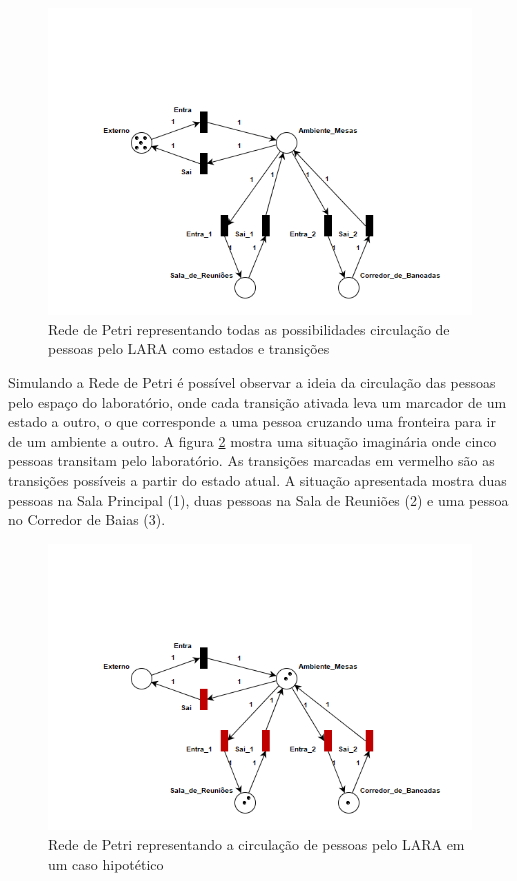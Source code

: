  \begin{figure}[H]
    \centering
    \includegraphics[width=0.8\linewidth]{figs/Metodologia/Petri_net.png}
    \caption{Rede de Petri representando todas as possibilidades circulação de pessoas pelo LARA como estados e transições}
    \label{fig:Petri1}
\end{figure}

Simulando a Rede de Petri é possível observar a ideia da circulação das pessoas pelo espaço do laboratório, onde cada transição ativada leva um marcador de um estado a outro, o que corresponde a uma pessoa cruzando uma fronteira para ir de um ambiente a outro. A figura \ref{fig:Petri2} mostra uma situação imaginária onde cinco pessoas transitam pelo laboratório. As transições marcadas em vermelho são as transições possíveis a partir do estado atual. A situação apresentada mostra duas pessoas na Sala Principal (1), duas pessoas na Sala de Reuniões (2) e uma pessoa no Corredor de Baias (3).

 \begin{figure}[H]
    \centering
    \includegraphics[width=0.8\linewidth]{figs/Metodologia/Petri_net2.png}
    \caption{Rede de Petri representando a circulação de pessoas pelo LARA em um caso hipotético}
    \label{fig:Petri2}
\end{figure}
 
